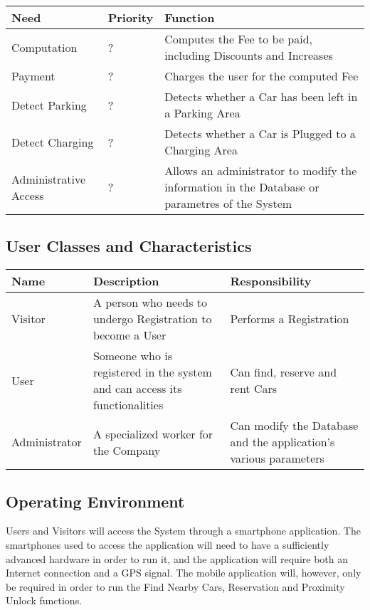 \begin{center}
  \begin{tabular}{|p{}|p{}|p{}|}
    \hline
    \textbf{Need} & \textbf{Priority} & \textbf{Function} \\ \hline
    Computation & ? & Computes the Fee to be paid, including Discounts and Increases \\ \hline
    Payment & ? & Charges the user for the computed Fee \\ \hline
    Detect Parking & ? & Detects whether a Car has been left in a Parking Area \\ \hline
    Detect Charging & ? & Detects whether a Car is Plugged to a Charging Area \\ \hline
    Administrative Access & ? & Allows an administrator to modify the information in the Database or parametres of the System \\ \hline
  \end{tabular}
\end{center}

\subsection{User Classes and Characteristics}
\begin{center}
  \begin{tabular}{|p{}|p{}|p{}|}
    \hline
    \textbf{Name} & \textbf{Description} & \textbf{Responsibility} \\ \hline
    Visitor & A person who needs to undergo Registration to become a User & Performs a Registration \\ \hline
    User & Someone who is registered in the system and can access its functionalities & Can find, reserve and rent Cars \\ \hline
    Administrator & A specialized worker for the Company & Can modify the Database and the application's various parameters \\ \hline
  \end{tabular}
\end{center}

\subsection{Operating Environment}\label{OE}
Users and Visitors will access the System through a smartphone application. The smartphones used to access the application will need to have a sufficiently advanced hardware in order to run it, and the application will require both an Internet connection and a GPS signal. The mobile application will, however, only be required in order to run the Find Nearby Cars, Reservation and Proximity Unlock functions.

